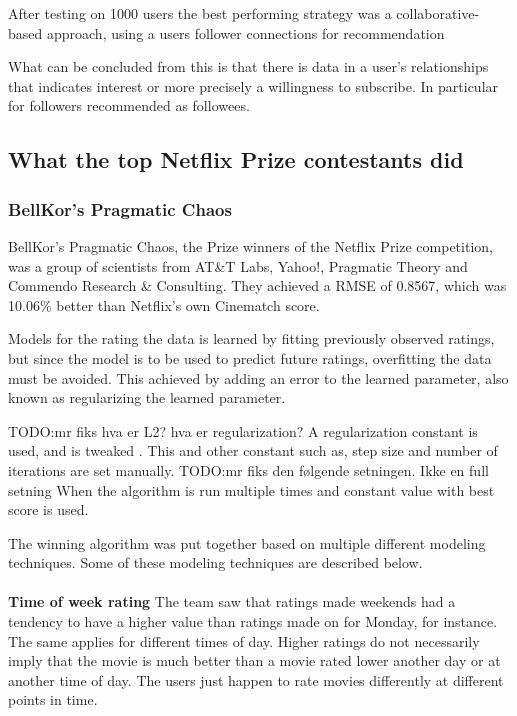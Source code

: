 After testing on 1000 users the best performing strategy was a collaborative-based approach, using a users follower connections for recommendation

What can be concluded from this is that there is data in a user's relationships that indicates interest or more precisely a willingness to subscribe. In particular for followers recommended as followees.


\subsection{What the top Netflix Prize contestants did}\label{subsec:thewinners}
\subsubsection{BellKor's Pragmatic Chaos}
BellKor's Pragmatic Chaos, the Prize winners of the Netflix Prize competition, was a group of scientists from AT\&T Labs, Yahoo!, Pragmatic Theory and Commendo Research \& Consulting. They achieved a RMSE of 0.8567, which was 10.06\% better than Netflix's own Cinematch score.

Models for the rating the data is learned by fitting previously observed ratings, but since the model is to be used to predict future ratings, overfitting the data must be avoided. This achieved by adding an error to the learned parameter, also known as regularizing the learned parameter.

TODO:mr fiks hva er L2? hva er regularization?
A regularization constant is used, and is tweaked . This and other constant such as, step size and number of iterations are set manually.
TODO:mr fiks den følgende setningen. Ikke en full setning
When the algorithm is run multiple times and constant value with best score is used. \cite{BellKor-CF-TD}

The winning algorithm was put together based on multiple different modeling techniques. Some of these modeling techniques are described below. \\\\


\textbf{Time of week rating}  The team saw that ratings made weekends had a tendency to have a higher value than ratings made on for Monday, for instance. The same applies for different times of day. Higher ratings do not necessarily imply that the movie is much better than a movie rated lower another day or at another time of day. The users just happen to rate movies differently at different points in time.


